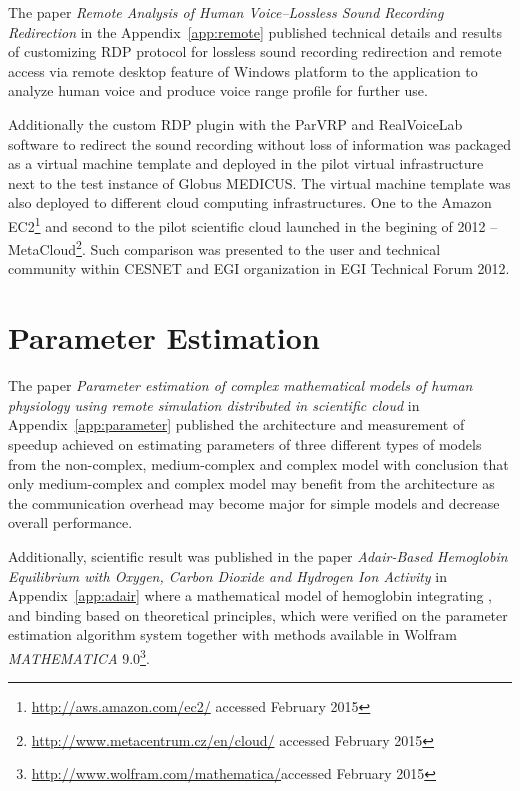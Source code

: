 The paper \cite{kulhanek2010b} \emph{Remote Analysis of Human Voice--Lossless Sound Recording Redirection} in the Appendix~\ref{app:remote} published technical details and results of customizing RDP protocol for lossless sound recording redirection and remote access via remote desktop feature of Windows platform to the application to analyze human voice and produce voice range profile for further use. 

Additionally the custom RDP plugin with the ParVRP and RealVoiceLab software to redirect the sound recording without loss of information was packaged as a virtual machine template and  deployed in the pilot virtual infrastructure next to the test instance of Globus MEDICUS. The virtual machine template was also deployed to different cloud computing infrastructures. One to the Amazon EC2\footnote{\url{http://aws.amazon.com/ec2/} accessed February 2015} and second to the pilot scientific cloud launched in the begining of 2012 --MetaCloud\footnote{\url{http://www.metacentrum.cz/en/cloud/} accessed February 2015}. Such comparison was presented to the user and technical community within CESNET and EGI organization in EGI Technical Forum 2012\cite{Kulhanek2012a}.

\section{Parameter Estimation}
\label{sec:resultsestimation}

The paper \cite{Kulhanek2014Parameters} \emph{Parameter estimation of complex mathematical models of human physiology using remote simulation distributed in scientific cloud} in Appendix~\ref{app:parameter} published the architecture and measurement of speedup achieved on estimating parameters of three  different types of models from the non-complex, medium-complex and complex model with conclusion that only medium-complex and complex model may benefit from the architecture as the communication overhead may become major for simple models and decrease overall performance. 

Additionally, scientific result was published in the paper \cite{Matejak2014sj} \emph{Adair-Based Hemoglobin Equilibrium with Oxygen, Carbon Dioxide and Hydrogen Ion Activity} in Appendix~\ref{app:adair} where a mathematical model of hemoglobin integrating ,  and  binding based on theoretical principles, which were verified on the parameter estimation algorithm system\cite{Kulhanek2014Parameters} together with methods available in Wolfram \emph{MATHEMATICA} 9.0\footnote{\url{http://www.wolfram.com/mathematica/}accessed February 2015}.

